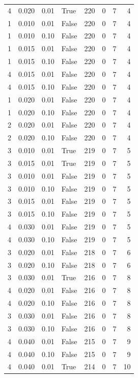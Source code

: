 \documentclass[a4paper,twoside,12pt]{book}
\begin{document}
\begin{table}
\begin{tabular}{rrrlrrrr}
				4 &  0.020 &     0.01 &     True &  220 &  0 &   7 &   4 \\
				1 &  0.010 &     0.01 &    False &  220 &  0 &   7 &   4 \\
				1 &  0.010 &     0.10 &    False &  220 &  0 &   7 &   4 \\
				1 &  0.015 &     0.01 &    False &  220 &  0 &   7 &   4 \\
				1 &  0.015 &     0.10 &    False &  220 &  0 &   7 &   4 \\
				4 &  0.015 &     0.01 &    False &  220 &  0 &   7 &   4 \\
				4 &  0.015 &     0.10 &    False &  220 &  0 &   7 &   4 \\
				1 &  0.020 &     0.01 &    False &  220 &  0 &   7 &   4 \\
				1 &  0.020 &     0.10 &    False &  220 &  0 &   7 &   4 \\
				2 &  0.020 &     0.01 &    False &  220 &  0 &   7 &   4 \\
				2 &  0.020 &     0.10 &    False &  220 &  0 &   7 &   4 \\
				3 &  0.010 &     0.01 &     True &  219 &  0 &   7 &   5 \\
				3 &  0.015 &     0.01 &     True &  219 &  0 &   7 &   5 \\
				3 &  0.010 &     0.01 &    False &  219 &  0 &   7 &   5 \\
				3 &  0.010 &     0.10 &    False &  219 &  0 &   7 &   5 \\
				3 &  0.015 &     0.01 &    False &  219 &  0 &   7 &   5 \\
				3 &  0.015 &     0.10 &    False &  219 &  0 &   7 &   5 \\
				4 &  0.030 &     0.01 &    False &  219 &  0 &   7 &   5 \\
				4 &  0.030 &     0.10 &    False &  219 &  0 &   7 &   5 \\
				3 &  0.020 &     0.01 &    False &  218 &  0 &   7 &   6 \\
				3 &  0.020 &     0.10 &    False &  218 &  0 &   7 &   6 \\
				3 &  0.030 &     0.01 &     True &  216 &  0 &   7 &   8 \\
				4 &  0.020 &     0.01 &    False &  216 &  0 &   7 &   8 \\
				4 &  0.020 &     0.10 &    False &  216 &  0 &   7 &   8 \\
				3 &  0.030 &     0.01 &    False &  216 &  0 &   7 &   8 \\
				3 &  0.030 &     0.10 &    False &  216 &  0 &   7 &   8 \\
				4 &  0.040 &     0.01 &    False &  215 &  0 &   7 &   9 \\
				4 &  0.040 &     0.10 &    False &  215 &  0 &   7 &   9 \\
				4 &  0.040 &     0.01 &     True &  214 &  0 &   7 &  10 \\
		\bottomrule
	\end{tabular}
\end{table}		
\end{document}
